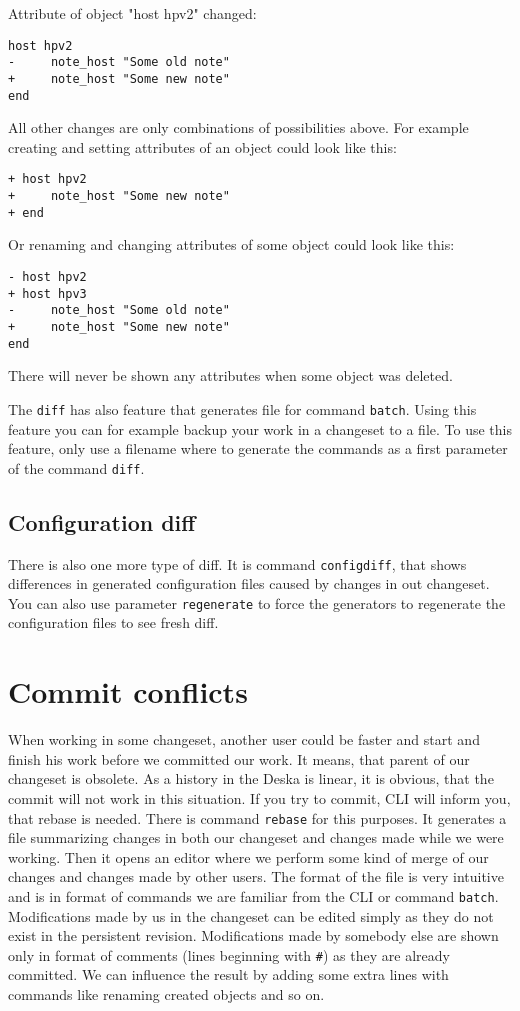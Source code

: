 \documentclass[deska]{subfiles}
\begin{document}
Attribute of object "host hpv2" changed:
\begin{verbatim}
host hpv2
-     note_host "Some old note"
+     note_host "Some new note"
end
\end{verbatim}

All other changes are only combinations of possibilities above. For example creating and setting attributes of an
object could look like this:
\begin{verbatim}
+ host hpv2
+     note_host "Some new note"
+ end
\end{verbatim}

Or renaming and changing attributes of some object could look like this:
\begin{verbatim}
- host hpv2
+ host hpv3
-     note_host "Some old note"
+     note_host "Some new note"
end
\end{verbatim}

There will never be shown any attributes when some object was deleted.

The {\tt diff} has also feature that generates file for command {\tt batch}. Using this feature you can for example backup
your work in a changeset to a file. To use this feature, only use a filename where to generate the commands as a first
parameter of the command {\tt diff}.

\subsection{Configuration diff}

There is also one more type of diff. It is command {\tt configdiff}, that shows differences in generated configuration files
caused by changes in out changeset. You can also use parameter {\tt regenerate} to force the generators to regenerate the
configuration files to see fresh diff.

\section{Commit conflicts}

When working in some changeset, another user could be faster and start and finish his work before we committed our work.
It means, that parent of our changeset is obsolete. As a history in the Deska is linear, it is obvious, that the commit
will not work in this situation. If you try to commit, CLI will inform you, that rebase is needed. There is command
{\tt rebase} for this purposes. It generates a file summarizing changes in both our changeset and changes made while
we were working. Then it opens an editor where we perform some kind of merge of our changes and changes made by other users.
The format of the file is very intuitive and is in format of commands we are familiar from the CLI or command {\tt batch}.
Modifications made by us in the changeset can be edited simply as they do not exist in the persistent revision.
Modifications made by somebody else are shown only in format of comments (lines beginning with {\tt \#}) as they are already
committed. We can influence the result by adding some extra lines with commands like renaming created objects and so on.
\end{document}
